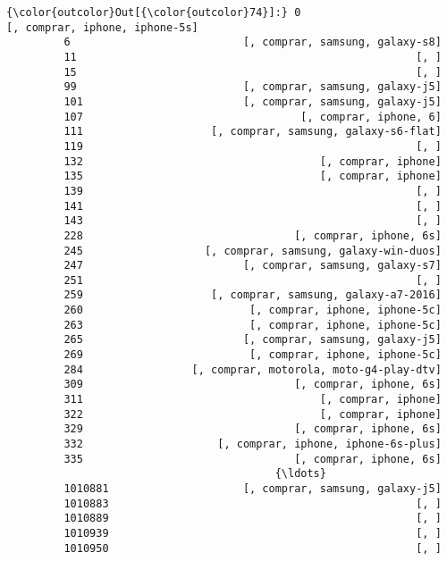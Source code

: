 \documentclass[11pt]{article}
\begin{document}
\begin{Verbatim}[commandchars=\\\{\}]
{\color{outcolor}Out[{\color{outcolor}74}]:} 0                            [, comprar, iphone, iphone-5s]
         6                           [, comprar, samsung, galaxy-s8]
         11                                                     [, ]
         15                                                     [, ]
         99                          [, comprar, samsung, galaxy-j5]
         101                         [, comprar, samsung, galaxy-j5]
         107                                  [, comprar, iphone, 6]
         111                    [, comprar, samsung, galaxy-s6-flat]
         119                                                    [, ]
         132                                     [, comprar, iphone]
         135                                     [, comprar, iphone]
         139                                                    [, ]
         141                                                    [, ]
         143                                                    [, ]
         228                                 [, comprar, iphone, 6s]
         245                   [, comprar, samsung, galaxy-win-duos]
         247                         [, comprar, samsung, galaxy-s7]
         251                                                    [, ]
         259                    [, comprar, samsung, galaxy-a7-2016]
         260                          [, comprar, iphone, iphone-5c]
         263                          [, comprar, iphone, iphone-5c]
         265                         [, comprar, samsung, galaxy-j5]
         269                          [, comprar, iphone, iphone-5c]
         284                 [, comprar, motorola, moto-g4-play-dtv]
         309                                 [, comprar, iphone, 6s]
         311                                     [, comprar, iphone]
         322                                     [, comprar, iphone]
         329                                 [, comprar, iphone, 6s]
         332                     [, comprar, iphone, iphone-6s-plus]
         335                                 [, comprar, iphone, 6s]
                                          {\ldots}                       
         1010881                     [, comprar, samsung, galaxy-j5]
         1010883                                                [, ]
         1010889                                                [, ]
         1010939                                                [, ]
         1010950                                                [, ]

\end{Verbatim}
\end{document}
